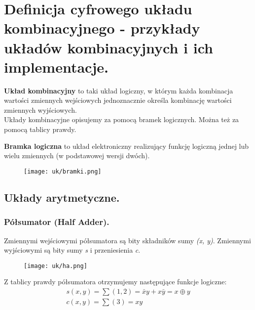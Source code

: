 \documentclass[main.tex]{subfiles}
\begin{document}
    \newpage

    \section{Definicja cyfrowego układu kombinacyjnego - przykłady układów kombinacyjnych i ich implementacje.}

    \begin{definition}
        \textbf{Układ kombinacyjny} to taki układ logiczny, w którym każda kombinacja wartości zmiennych wejściowych
        jednoznacznie określa kombinację wartości zmiennych wyjściowych.\\

        Układy kombinacyjne opisujemy za pomocą bramek logicznych. Można też za pomocą tablicy prawdy.
    \end{definition}

    \begin{definition}
        \textbf{Bramka logiczna} to układ elektroniczny realizujący funkcję logiczną jednej lub wielu zmiennych
        (w podstawowej wersji dwóch).
    \end{definition}

    \begin{figure}[H]
        \texttt{[image: uk/bramki.png]}
    \end{figure}

    \subsection{Układy arytmetyczne.}

    \subsubsection{Półsumator (Half Adder).}
    Zmiennymi wejściowymi półsumatora są bity składników sumy \textit{(x, y)}. Zmiennymi wyjściowymi są bity
    sumy \textit{s} i przeniesienia \textit{c}.

    \begin{figure}[H]
        \texttt{[image: uk/ha.png]}
    \end{figure}

    Z tablicy prawdy półsumatora otrzymujemy następujące funkcje logiczne:
    \begin{gather*}
        s(x,y) = \sum (1,2) = \bar{x}y + x\bar{y} = x \oplus y\\
        c(x,y) = \sum (3) = xy\\
    \end{gather*}
\end{document}
